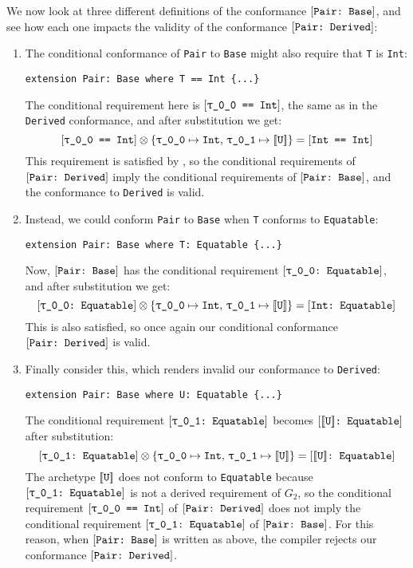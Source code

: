 \documentclass[../generics]{subfiles}
\begin{document}
We now look at three different definitions of the conformance $[\texttt{Pair:~Base}]$, and see how each one impacts the validity of the conformance $[\texttt{Pair:~Derived}]$:
\begin{enumerate}
\item
The conditional conformance of \texttt{Pair} to \texttt{Base} might also require that \texttt{T} is \texttt{Int}:
\begin{Verbatim}
extension Pair: Base where T == Int {...}
\end{Verbatim}
The conditional requirement here is $\SameReq{\rT}{Int}$, the same as in the \texttt{Derived} conformance, and after substitution we get:
\[\SameReq{\rT}{Int}\otimes \SubstMap{\SubstType{\rT}{Int},\,\SubstType{\rU}{$\archetype{U}$}}=\SameReq{Int}{Int}\]
This requirement is satisfied by , so the conditional requirements of $[\texttt{Pair:~Derived}]$ imply the conditional requirements of $[\texttt{Pair:~Base}]$, and the conformance to \texttt{Derived} is valid.

\item Instead, we could conform \texttt{Pair} to \texttt{Base} when \texttt{T} conforms to \texttt{Equatable}:
\begin{Verbatim}
extension Pair: Base where T: Equatable {...}
\end{Verbatim}
Now, $[\texttt{Pair:~Base}]$ has the conditional requirement $\ConfReq{\rT}{Equatable}$, and after substitution we get:
\[\ConfReq{\rT}{Equatable}\otimes\SubstMap{\SubstType{\rT}{Int},\,\SubstType{\rU}{$\archetype{U}$}}=\ConfReq{Int}{Equatable}\]
This is also satisfied, so once again our conditional conformance $[\texttt{Pair:~Derived}]$ is valid.

\item Finally consider this, which renders invalid our conformance to \texttt{Derived}:
\begin{Verbatim}
extension Pair: Base where U: Equatable {...}
\end{Verbatim}
The conditional requirement $\ConfReq{\rU}{Equatable}$ becomes $[\texttt{$[\![\texttt{U}]\!]$:~Equatable}]$ after substitution:
\[\ConfReq{\rU}{Equatable}\otimes \SubstMap{\SubstType{\rT}{Int},\,\SubstType{\rU}{$\archetype{U}$}}=\ConfReq{$\archetype{U}$}{Equatable}\]
The archetype $[\![\texttt{U}]\!]$ does not conform to \texttt{Equatable} because $\ConfReq{\rU}{Equatable}$ is not a derived requirement of $G_2$, so the conditional requirement $\SameReq{\rT}{Int}$ of $[\texttt{Pair:~Derived}]$ does not imply the conditional requirement $\ConfReq{\rU}{Equatable}$ of $[\texttt{Pair:~Base}]$. For this reason, when $[\texttt{Pair:~Base}]$ is written as above, the compiler rejects our conformance $[\texttt{Pair:~Derived}]$.
\end{enumerate}
\end{document}
